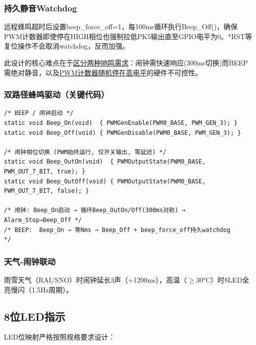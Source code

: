 \documentclass[12pt,hyperref,a4paper,UTF8]{ctexart}
\begin{document}
\subsubsection{持久静音Watchdog}

远程蜂鸣超时后设置beep\_force\_off=1，每100ms循环执行Beep\_Off()，确保PWM计数器即使停在HIGH相位也强制拉低PK5输出直至GPIO电平为0。*RST等复位操作不会取消watchdog，反而加强。

此设计的核心难点在于\underline{区分两种响鸣需求}：闹钟需快速响应(300ms切换)而BEEP需绝对静音，以及\underline{PWM计数器随机停在高电平}的硬件不可控性。

\subsubsection{双路径蜂鸣驱动（关键代码）}

\begin{verbatim}
/* BEEP / 闹钟启动 */
static void Beep_On(void)  { PWMGenEnable(PWM0_BASE, PWM_GEN_3); }
static void Beep_Off(void) { PWMGenDisable(PWM0_BASE, PWM_GEN_3); }

/* 闹钟相位切换 (PWM始终运行, 仅开关输出, 零延迟) */
static void Beep_OutOn(void)  { PWMOutputState(PWM0_BASE, PWM_OUT_7_BIT, true); }
static void Beep_OutOff(void) { PWMOutputState(PWM0_BASE, PWM_OUT_7_BIT, false); }

/* 闹钟: Beep_On启动 → 循环Beep_OutOn/Off(300ms对称) → Alarm_Stop→Beep_Off */
/* BEEP:  Beep_On → 等Nms → Beep_Off + beep_force_off持久watchdog            */
\end{verbatim}

\subsubsection{天气-闹钟联动}

雨雪天气（RAI/SNO）时闹钟延长3声（+1200ms），高温（$\geq$30°C）时8LED全亮慢闪（1.5Hz周期）。

\subsection{8位LED指示}

LED位映射严格按照规格要求设计：
\end{document}
